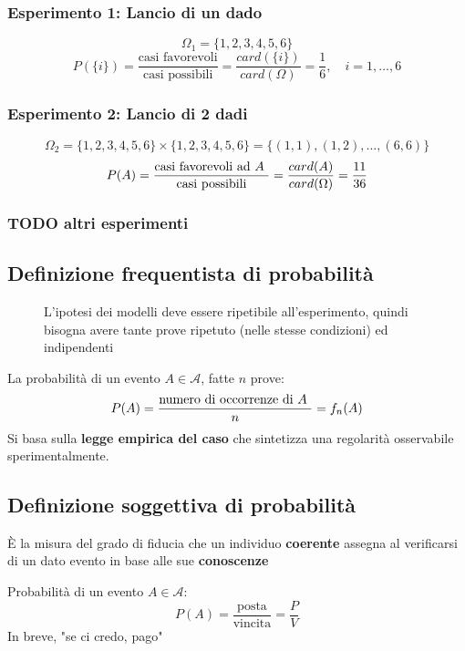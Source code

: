 \documentclass[a4paper]{article}
\theoremstyle{break}
\theoremstyle{break}
\theoremstyle{break}
\theoremstyle{break}
\begin{document}
\subsubsection{Esperimento 1: Lancio di un dado}
\[
\Omega_1 = \{1, 2, 3, 4, 5, 6\}
\] 
\[
P(\{i\} ) = \frac{\text{casi favorevoli}}{\text{casi possibili}} = \frac{card(\{i\} )}
{card(\Omega)} = \frac{1}{6}, \quad i = 1, \ldots, 6
\] 

\subsubsection{Esperimento 2: Lancio di 2 dadi}
\[
\Omega_2 = \{1, 2, 3, 4, 5, 6\} \times \{1, 2, 3, 4, 5, 6\} = \{(1,1), (1,2), \ldots, (6,6)\}
\]
\[
  P(A) = \frac{\text{casi favorevoli ad \( A \) }}{\text{casi possibili}} = \frac{card(A)}{card(\Omega)}
  = \frac{11}{36}
\]
\subsubsection{TODO altri esperimenti}

\subsection{Definizione frequentista di probabilità}
\begin{figure}[H]
  \begin{define}
    L'ipotesi dei modelli deve essere ripetibile all'esperimento, quindi bisogna avere
    tante prove ripetuto (nelle stesse condizioni) ed indipendenti
  \end{define}
\end{figure}

La probabilità di un evento \( A \in \mathcal{A} \), fatte \( n \) prove:
\[
  P(A) = \frac{\text{numero di occorrenze di \( A \) }}{n} = f_n(A)
\] 
Si basa sulla \textbf{legge empirica del caso} che sintetizza una regolarità osservabile
sperimentalmente.

\subsection{Definizione soggettiva di probabilità}
È la misura del grado di fiducia che un individuo \textbf{coerente} assegna al verificarsi
di un dato evento in base alle sue \textbf{conoscenze}

Probabilità di un evento \( A \in \mathcal{A} \):
\[
  P(A) = \frac{\text{posta}}{\text{{vincita}}} = \frac{P}{V}
\] 
In breve, "se ci credo, pago"
\end{document}
